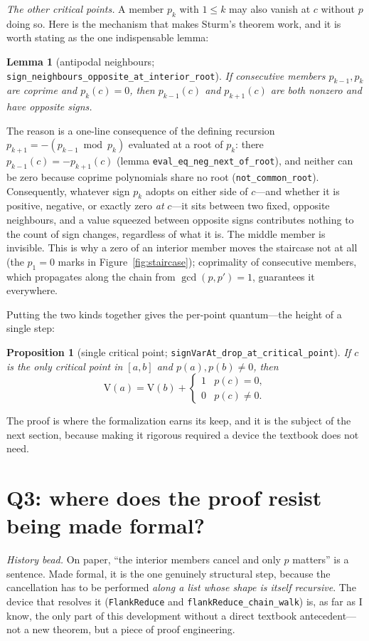 \documentclass[11pt]{article}
\newtheorem{lemma}{Lemma}
\newtheorem{proposition}{Proposition}
\newcommand{\lean}[1]{\texttt{#1}}
\newcommand{\V}{\mathrm{V}}
\begin{document}
\emph{The other critical points.} A member $p_k$ with $1\le k$ may also vanish at $c$ without $p$
doing so. Here is the mechanism that makes Sturm's theorem work, and it is worth stating as the
one indispensable lemma:
\begin{lemma}[antipodal neighbours; \lean{sign\_neighbours\_opposite\_at\_interior\_root}]
\label{lem:antipodal}
If consecutive members $p_{k-1},p_k$ are coprime and $p_k(c)=0$, then $p_{k-1}(c)$ and
$p_{k+1}(c)$ are both nonzero and have \emph{opposite} signs.
\end{lemma}
The reason is a one-line consequence of the defining recursion $p_{k+1}=-(p_{k-1}\bmod p_k)$
evaluated at a root of $p_k$: there $p_{k-1}(c)=-p_{k+1}(c)$ (lemma \lean{eval\_eq\_neg\_next\_of\_root}),
and neither can be zero because coprime polynomials share no root (\lean{not\_common\_root}).
Consequently, whatever sign $p_k$ adopts on either side of $c$---and whether it is positive,
negative, or exactly zero \emph{at} $c$---it sits between two fixed, opposite neighbours, and a
value squeezed between opposite signs contributes nothing to the count of sign changes, regardless
of what it is. The middle member is invisible. This is why a zero of an interior member moves the
staircase not at all (the $p_1=0$ marks in Figure~\ref{fig:staircase}); coprimality of consecutive
members, which propagates along the chain from $\gcd(p,p')=1$, guarantees it everywhere.

Putting the two kinds together gives the per-point quantum---the height of a single step:
\begin{proposition}[single critical point; \lean{signVarAt\_drop\_at\_critical\_point}]
\label{prop:quantum}
If $c$ is the only critical point in $[a,b]$ and $p(a),p(b)\ne0$, then
\[
  \V(a)=\V(b)+\begin{cases}1 & p(c)=0,\\ 0 & p(c)\ne0.\end{cases}
\]
\end{proposition}
The proof is where the formalization earns its keep, and it is the subject of the next section,
because making it rigorous required a device the textbook does not need.

\section{Q3: where does the proof resist being made formal?}\label{sec:q3}

\emph{History bead.} On paper, ``the interior members cancel and only $p$ matters'' is a sentence.
Made formal, it is the one genuinely structural step, because the cancellation has to be performed
\emph{along a list whose shape is itself recursive}. The device that resolves it
(\lean{FlankReduce} and \lean{flankReduce\_chain\_walk}) is, as far as I know, the only part of
this development without a direct textbook antecedent---not a new theorem, but a piece of proof
engineering.
\end{document}
